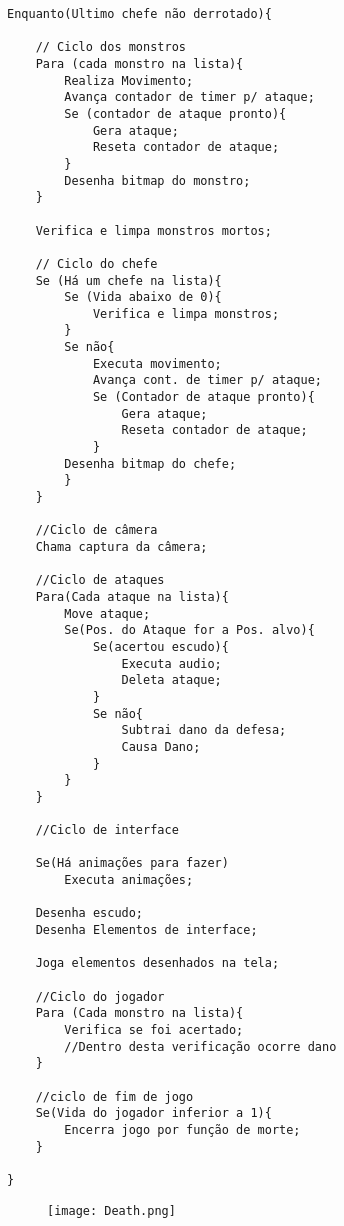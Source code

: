 \documentclass[12pt]{sciposter}
\begin{document}
\begin{multicols}{3}
\begin{lstlisting}
Enquanto(Ultimo chefe não derrotado){
    
    // Ciclo dos monstros
    Para (cada monstro na lista){
        Realiza Movimento;
        Avança contador de timer p/ ataque;
        Se (contador de ataque pronto){
            Gera ataque;
            Reseta contador de ataque;
        }
        Desenha bitmap do monstro;
    }
    
    Verifica e limpa monstros mortos;
    
    // Ciclo do chefe
    Se (Há um chefe na lista){
        Se (Vida abaixo de 0){
            Verifica e limpa monstros;
        }
        Se não{
            Executa movimento;
            Avança cont. de timer p/ ataque;
            Se (Contador de ataque pronto){
                Gera ataque;
                Reseta contador de ataque;
            }
        Desenha bitmap do chefe;
        }
    }
    
    //Ciclo de câmera
    Chama captura da câmera;
    
    //Ciclo de ataques
    Para(Cada ataque na lista){
        Move ataque;
        Se(Pos. do Ataque for a Pos. alvo){
            Se(acertou escudo){
                Executa audio;
                Deleta ataque;
            }
            Se não{
                Subtrai dano da defesa;
                Causa Dano;
            }
        }
    }
    
    //Ciclo de interface
    
    Se(Há animações para fazer)
        Executa animações;
        
    Desenha escudo;
    Desenha Elementos de interface;
    
    Joga elementos desenhados na tela;
    
    //Ciclo do jogador
    Para (Cada monstro na lista){
        Verifica se foi acertado;
        //Dentro desta verificação ocorre dano
    }
    
    //ciclo de fim de jogo
    Se(Vida do jogador inferior a 1){
        Encerra jogo por função de morte;
    }
    
}

\end{lstlisting}


\begin{figure}[!htb]
    \centering
    \texttt{[image: Death.png]}
\end{figure}


\end{multicols}
\end{document}
